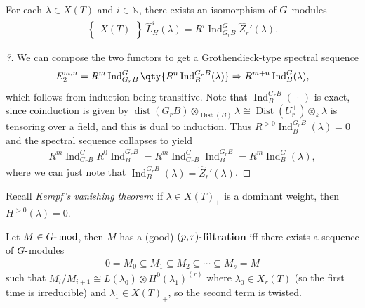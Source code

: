 \begin{proposition}[?]

For each \(\lambda\in X(T)\) and \(i\in {\mathbb{N}}\), there exists an
isomorphism of \(G{\hbox{-}}\)modules
\begin{align*}  \left\{{\substack{X(T)}}\right\} \ \widehat{L}_
H^i(\lambda) = R^i \operatorname{Ind}_{G_r B}^G \widehat{Z}_r'( \lambda  )
.\end{align*}

\end{proposition}

\begin{proof}[?]

We can compose the two functors to get a Grothendieck-type spectral
sequence
\begin{align*}  
E_2^{m, n} = R^m \operatorname{Ind}_{G_r B}^{G} \qty{ R^n \operatorname{Ind}_{B}^{G_r B}(\lambda) }
\Rightarrow
R^{m+n} \operatorname{Ind}_B^G(\lambda)
,\end{align*}
which follows from induction being transitive. Note that
\(\operatorname{Ind}_{B}^{G_r B}({\,\cdot\,})\) is exact, since
coinduction is given by
\(\operatorname{dist}(G_rB)\otimes_{\operatorname{Dist}(B)}\lambda \cong \operatorname{Dist}(U_r^+)\otimes_k \lambda\)
is tensoring over a field, and this is dual to induction. Thus
\(R^{>0} \operatorname{Ind}_B^{G_r B}(\lambda) = 0\) and the spectral
sequence collapses to yield
\begin{align*}  
R^m \operatorname{Ind}_{G_r B}^G R^0 \operatorname{Ind}_{B}^{G_r B} 
= R^m \operatorname{Ind}_{G_r B}^G \operatorname{Ind}_{B}^{G_r B} 
= R^m \operatorname{Ind}_B^G(\lambda)
,\end{align*}
where we can just note that
\(\operatorname{Ind}_B^{G_r B}(\lambda) = \widehat{Z}_r'(\lambda)\).

\end{proof}

Recall \emph{Kempf's vanishing theorem}: if \(\lambda \in X(T)_+\) is a
dominant weight, then \(H^{>0}(\lambda) = 0\).

\begin{definition}

Let \(M\in {{G}{\hbox{-}}\operatorname{mod}}\), then \(M\) has a (good)
\textbf{\((p, r){\hbox{-}}\)filtration} iff there exists a sequence of
\(G{\hbox{-}}\)modules
\begin{align*}  
0 = M_0 \subseteq M_1 \subseteq M_2 \subseteq \cdots \subseteq M_s = M
\end{align*}
such that
\(M_i / M_{i+1} \cong L(\lambda_0) \otimes H^0(\lambda_1)^{(r)}\) where
\(\lambda_0 \in X_r(T)\) (so the first time is irreducible) and
\(\lambda_1 \in X(T)_+\), so the second term is twisted.

\end{definition}

